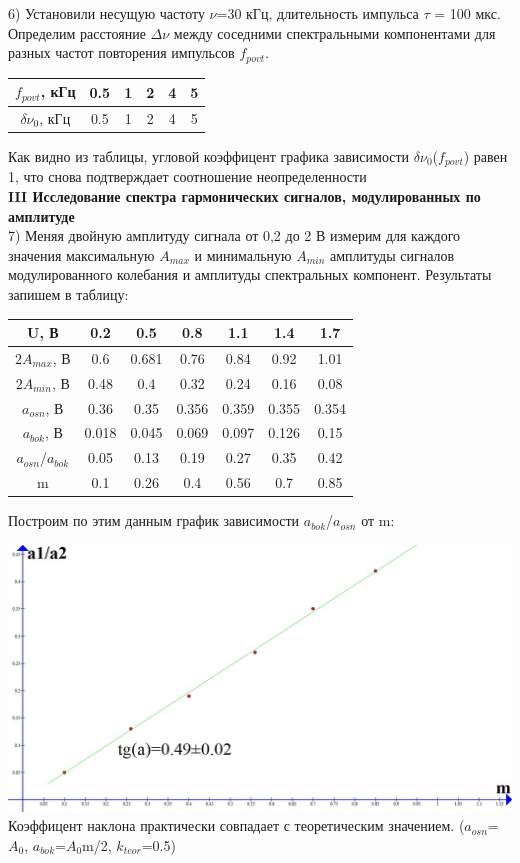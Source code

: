 \documentclass[a4paper,12pt]{article} %
\begin{document}
6) Установили несущую частоту $\nu$=30 кГц, длительность импульса $\tau$ = 100
мкс. Определим расстояние $\Delta$$\nu$ между соседними спектральными компонентами
для разных частот повторения импульсов $f_{povt}$. \\
\begin{center}

\begin{tabular}{|c|c|c|c|c|c|}
\hline 
$f_{povt}$, кГц & 0.5 & 1 & 2 & 4 & 5 \\ 
\hline 
$\delta$$\nu_0$, кГц & 0.5 & 1 & 2 & 4 & 5 \\ 
\hline 
\end{tabular} 
\end{center}
Как видно из таблицы, угловой коэффицент графика зависимости $\delta$$\nu_0$($f_{povt}$) равен 1, что снова подтверждает соотношение неопределенности\\


\textbf{III Исследование спектра гармонических сигналов,
модулированных по амплитуде}\\

7) Меняя двойную амплитуду сигнала от 0,2 до 2 В измерим для каждого значения максимальную
$A_{max}$ и минимальную $A_{min}$ амплитуды сигналов модулированного колебания и амплитуды спектральных
компонент. Результаты запишем в таблицу:
\begin{center}

\begin{tabular}{|c|c|c|c|c|c|c|}
\hline 
U, В & 0.2 & 0.5 & 0.8 & 1.1 & 1.4 & 1.7 \\ 
\hline 
$2A_{max}$, В & 0.6 & 0.681 & 0.76 & 0.84 & 0.92 & 1.01 \\ 
\hline 
$2A_{min}$, В & 0.48 & 0.4 & 0.32 & 0.24 & 0.16 & 0.08 \\ 
\hline 
$a_{osn}$, В & 0.36 & 0.35 & 0.356 & 0.359 & 0.355 & 0.354 \\ 
\hline 
$a_{bok}$, В & 0.018 & 0.045 & 0.069 & 0.097 & 0.126 & 0.15 \\ 
\hline 
$a_{osn}$/$a_{bok}$ & 0.05 & 0.13 & 0.19 & 0.27 & 0.35 & 0.42 \\ 
\hline 
m & 0.1 & 0.26 & 0.4 & 0.56 & 0.7 & 0.85 \\ 
\hline 
\end{tabular} 

\end{center}


Построим по этим данным график зависимости $a_{bok}$/$a_{osn}$ от m: \\
\begin{flushleft}

\includegraphics[scale=0.35]{5}
Коэффицент наклона практически совпадает с теоретическим значением. ($a_{osn}$=$A_0$, $a_{bok}$=$A_0$m/2, $k_{teor}$=0.5)
\\

\end{flushleft}
\end{document}
